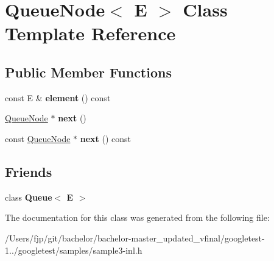 \hypertarget{class_queue_node}{}\section{Queue\+Node$<$ E $>$ Class Template Reference}
\label{class_queue_node}
\subsection*{Public Member Functions}
\begin{DoxyCompactItemize}
\item 
\mbox{\label{class_queue_node_a1c61b3ed32e089f5901b87022ef84985}} 
const E \& {\bfseries element} () const
\item 
\mbox{\label{class_queue_node_a8a9fdf488da06533360999ef85db56ea}} 
\mbox{\hyperlink{class_queue_node}{Queue\+Node}} $\ast$ {\bfseries next} ()
\item 
\mbox{\label{class_queue_node_ada477e4f309f29383112dbda473dd985}} 
const \mbox{\hyperlink{class_queue_node}{Queue\+Node}} $\ast$ {\bfseries next} () const
\end{DoxyCompactItemize}
\subsection*{Friends}
\begin{DoxyCompactItemize}
\item 
\mbox{\label{class_queue_node_ad4336229b1d7c3626e4ba69f236b202d}} 
class {\bfseries Queue$<$ E $>$}
\end{DoxyCompactItemize}


The documentation for this class was generated from the following file\+:\begin{DoxyCompactItemize}
\item 
/\+Users/fjp/git/bachelor/bachelor-\/master\+\_\+updated\+\_\+vfinal/googletest-\/1../googletest/samples/sample3-\/inl.\+h\end{DoxyCompactItemize}
